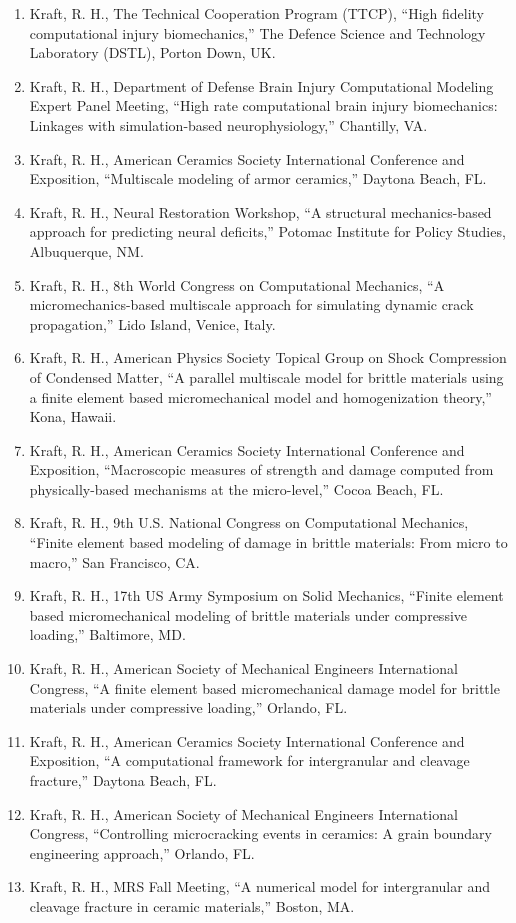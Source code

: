 \documentclass[11pt]{article}
\begin{document}
\begin{enumerate}
\item
  Kraft, R. 
H., The Technical Cooperation Program (TTCP), ``High fidelity
  computational injury biomechanics,'' The Defence Science and Technology
  Laboratory (DSTL), Porton Down, UK.
\item
  Kraft, R. 
H., Department of Defense Brain Injury Computational
  Modeling Expert Panel Meeting, ``High rate computational brain injury
  biomechanics: Linkages with simulation-based neurophysiology,''
  Chantilly, VA.
\item
  Kraft, R. 
H., American Ceramics Society International Conference and
  Exposition, ``Multiscale modeling of armor ceramics,'' Daytona Beach,
  FL.
\item
  Kraft, R. 
H., Neural Restoration Workshop, ``A structural
  mechanics-based approach for predicting neural deficits,'' Potomac
  Institute for Policy Studies, Albuquerque, NM.
\item
  Kraft, R. 
H., 8th World Congress on Computational Mechanics, ``A
  micromechanics-based multiscale approach for simulating dynamic crack
  propagation,'' Lido Island, Venice, Italy.
\item
  Kraft, R. 
H., American Physics Society Topical Group on Shock
  Compression of Condensed Matter, ``A parallel multiscale model for
  brittle materials using a finite element based micromechanical model
  and homogenization theory,'' Kona, Hawaii.
\item
  Kraft, R. 
H., American Ceramics Society International Conference and
  Exposition, ``Macroscopic measures of strength and damage computed from
  physically-based mechanisms at the micro-level,'' Cocoa Beach, FL.
\item
  Kraft, R. 
H., 9th U.S. 
National Congress on Computational Mechanics,
  ``Finite element based modeling of damage in brittle materials: From
  micro to macro,'' San Francisco, CA.
\item
  Kraft, R. 
H., 17th US Army Symposium on Solid Mechanics, ``Finite
  element based micromechanical modeling of brittle materials under
  compressive loading,'' Baltimore, MD.
\item
  Kraft, R. 
H., American Society of Mechanical Engineers International
  Congress, ``A finite element based micromechanical damage model for
  brittle materials under compressive loading,'' Orlando, FL.
\item
  Kraft, R. 
H., American Ceramics Society International Conference and
  Exposition, ``A computational framework for intergranular and cleavage
  fracture,'' Daytona Beach, FL.
\item
  Kraft, R. 
H., American Society of Mechanical Engineers International
  Congress, ``Controlling microcracking events in ceramics: A grain
  boundary engineering approach,'' Orlando, FL.
\item
  Kraft, R. 
H., MRS Fall Meeting, ``A numerical model for intergranular
  and cleavage fracture in ceramic materials,'' Boston, MA.
\end{enumerate}
\end{document}

